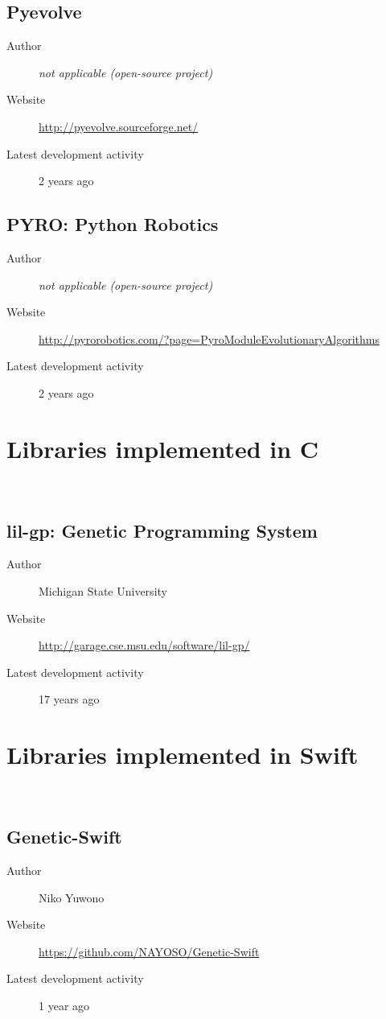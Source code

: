\subsection*{Pyevolve}
\begin{description}
    \item[Author] \textit{not applicable (open-source project)}
    \item[Website] \url{http://pyevolve.sourceforge.net/}
    \item[Latest development activity] 2 years ago
\end{description}


\subsection*{PYRO: Python Robotics}
\begin{description}
    \item[Author] \textit{not applicable (open-source project)}
    \item[Website] \url{http://pyrorobotics.com/?page=PyroModuleEvolutionaryAlgorithms}
    \item[Latest development activity] 2 years ago
\end{description}


\section{Libraries implemented in C}~\label{section:libraries-c}
\subsection*{lil-gp: Genetic Programming System}
\begin{description}
    \item[Author] Michigan State University
    \item[Website] \url{http://garage.cse.msu.edu/software/lil-gp/}
    \item[Latest development activity] 17 years ago
\end{description}


\section{Libraries implemented in Swift}~\label{section:libraries-swift}
\subsection*{Genetic-Swift}
\begin{description}
    \item[Author] Niko Yuwono
    \item[Website] \url{https://github.com/NAYOSO/Genetic-Swift}
    \item[Latest development activity] 1 year ago
\end{description}


